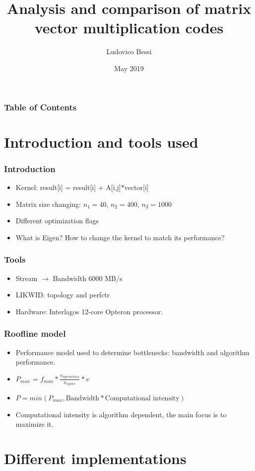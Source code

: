 \documentclass{beamer}
\title {Analysis and comparison of matrix vector multiplication codes}
\author %
{Ludovico Bessi}
\institute[VFU] %
{
  Matematica per l'ingegneria\\
  Politecnico di Torino
}
\date{May 2019}
\begin{document}
 
\frame{\titlepage}

\begin{frame}
\frametitle{Table of Contents}
\tableofcontents
\end{frame}

\section{Introduction and tools used}
\begin{frame}
\frametitle{Introduction}
\begin{itemize}
 \item Kernel: result[i] = result[i] + A[i,j]$*$vector[i]
 \item Matrix size changing: $n_1 = 40$, $n_2 = 400$, $n_3 = 1000$
 \item Different optimization flags 
 \item What is Eigen? How to change the kernel to match its performance?
\end{itemize}
\end{frame}

\begin{frame}
\frametitle{Tools}
\begin{itemize}
\item  Stream $\to$ Bandwidth 6000 MB/s
\item LIKWID: topology and perfctr
\item Hardware: Interlagos 12-core Opteron processor.
\end{itemize}
\end{frame}

\begin{frame}
\frametitle{Roofline model}
\begin{itemize}
\item  Performance model used to determine bottlenecks: bandwidth and algorithm performance.
\item  $P_{max}$ = $f_{max} * \frac{n_{operations}}{n_{cycles}} * v$
\item  $P = min(P_{max}, \text{Bandwidth} * \text{Computational intensity})$
\item  Computational intensity is algorithm dependent, the main focus is to maximize it.
\end{itemize}
\end{frame}


\section{Different implementations}
\end{document}
